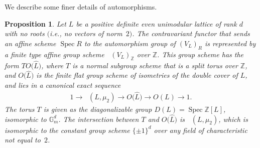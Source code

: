\documentclass[pdftex]{sigma}
\newcommand{\bG}{\mathbb{G}}
\newcommand{\bZ}{\mathbb{Z}}
\DeclareMathOperator{\uAut}{\underline{Aut}}
\DeclareMathOperator{\uHom}{\underline{Hom}}
\DeclareMathOperator{\Spec}{Spec}
\newtheorem{prop}[thm]{Proposition}
\theoremstyle{definition}
\begin{document}
We describe some finer details of automorphisms.

\begin{prop} \label{prop:automorphism-group-of-standard-R-form}Let $L$ be a positive definite even unimodular lattice of rank $d$ with no roots $($i.e., no vectors of norm~$2)$. The contravariant functor that sends an affine scheme $\Spec R$ to the automorphism group of $(V_L)_R$ is represented by a finite type affine group scheme $\uAut (V_L)_\bZ$ over $\bZ$. This group scheme has the form $T O\big(\hat{L}\big)$, where $T$ is a normal subgroup scheme that is a split torus over $\bZ$, and $O\big(\hat{L}\big)$ is the finite flat group scheme of isometries of the double cover of $L$, and lies in a canonical exact sequence
\begin{gather*} 1 \to \uHom(L,\mu_2) \to O\big(\hat{L}\big) \to O(L) \to 1. \end{gather*}
The torus $T$ is given as the diagonalizable group $D(L) = \Spec \bZ[L]$, isomorphic to $\bG_m^d$. The intersection between $T$ and $O\big(\hat{L}\big)$ is $\uHom(L,\mu_2)$, which is isomorphic to the constant group scheme $\{\pm 1\}^d$ over any field of characteristic not equal to~$2$.
\end{prop}
\end{document}
